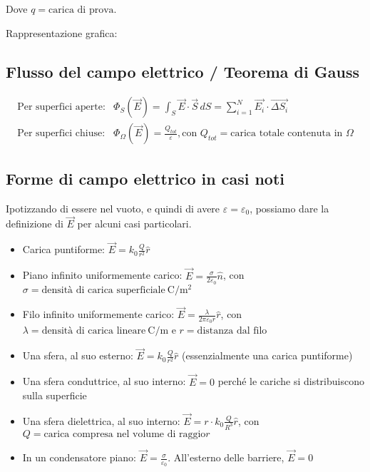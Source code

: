 Dove $q = \text{carica di prova}$.

Rappresentazione grafica:


\subsection{Flusso del campo elettrico / Teorema di Gauss}

\begin{align*}
    \text{Per superfici aperte}: & \Phi_S(\vec{E}) = \int_S \vec{E} \cdot \vec{S} \, dS = \sum_{i = 1}^{N} \vec{E_i} \cdot \vec{\Delta S_i}            \\
    \text{Per superfici chiuse}: & \Phi_\Omega(\vec{E}) = \frac{Q_{tot}}{\varepsilon}, \text{con } Q_{tot} = \text{carica totale contenuta in } \Omega
\end{align*}


\subsection{Forme di campo elettrico in casi noti}

Ipotizzando di essere nel vuoto, e quindi di avere $\varepsilon = \varepsilon_0$, possiamo dare la definizione di $\vec{E}$ per alcuni casi particolari.

\begin{itemize}
    \item Carica puntiforme: $\vec{E} = k_0 \frac{Q}{r^2} \hat{r}$
    \item Piano infinito uniformemente carico: $\vec{E} = \frac{\sigma}{2\varepsilon_0} \hat{n}$, con $\sigma = \text{densità di carica superficiale} \SI{}{\coulomb\per\meter\squared}$
    \item Filo infinito uniformemente carico: $\vec{E} = \frac{\lambda}{2\pi\varepsilon_0 r} \hat{r}$, con $\lambda = \text{densità di carica lineare} \SI{}{\coulomb\per\meter}$ e $r = \text{distanza dal filo}$
    \item Una sfera, al suo esterno: $\vec{E} = k_0 \frac{Q}{r^2} \hat{r}$ (essenzialmente una carica puntiforme)
    \item Una sfera conduttrice, al suo interno: $\vec{E} = 0$ perché le cariche si distribuiscono sulla superficie
    \item Una sfera dielettrica, al suo interno: $\vec{E} = r \cdot k_0 \frac{Q}{R^3} \hat{r}$, con $Q = \text{carica compresa nel volume di raggio} r$
    \item In un condensatore piano: $\vec{E} = \frac{\sigma}{\varepsilon_0}$. All'esterno delle barriere, $\vec{E} = 0$
\end{itemize}

